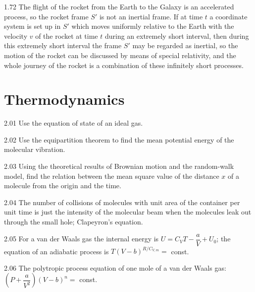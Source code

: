 \begin{hint}{1.72}
The flight of the rocket from the Earth to the Galaxy is an accelerated process, so the rocket frame $S'$ is not an inertial frame. If at time $t$ a coordinate system is set up in $S'$ which moves uniformly relative to the Earth with the velocity $v$ of the rocket at time $t$ during an extremely short interval, then during this extremely short interval the frame $S'$ may be regarded as inertial, so the motion of the rocket can be discussed by means of special relativity, and the whole journey of the rocket is a combination of these infinitely short processes.
\end{hint}

\section{Thermodynamics}

\begin{hint}{2.01}
Use the equation of state of an ideal gas.
\end{hint}

\begin{hint}{2.02}
Use the equipartition theorem to find the mean potential energy of the molecular vibration.
\end{hint}

\begin{hint}{2.03}
Using the theoretical results of Brownian motion and the random-walk model, find the relation between the mean square value of the distance $x$ of a molecule from the origin and the time.
\end{hint}

\begin{hint}{2.04}
The number of collisions of molecules with unit area of the container per unit time is just the intensity of the molecular beam when the molecules leak out through the small hole; Clapeyron's equation.
\end{hint}

\begin{hint}{2.05}
For a van der Waals gas the internal energy is $U=C_VT-\dfrac{a}{V}+U_0$; the equation of an adiabatic process is $T(V-b)^{R/C_{V,m}}=$ const.
\end{hint}

\begin{hint}{2.06}
The polytropic process equation of one mole of a van der Waals gas: $\left(P+\dfrac{a}{V^2}\right)(V-b)^n=$ const.
\end{hint}

